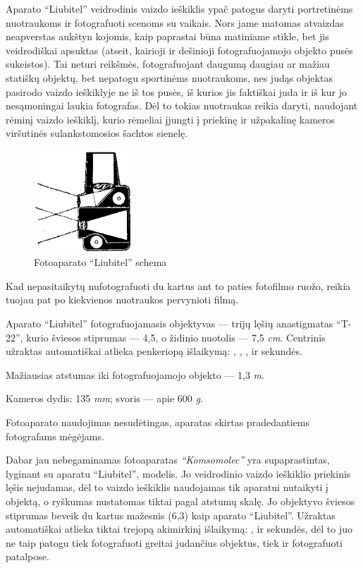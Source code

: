 \documentclass[12pt]{book}
\begin{document}
			Aparato ``Liubitel'' veidrodinis vaizdo ieškiklis ypač patogus daryti portretinėms nuotraukoms ir fotografuoti scenoms su vaikais. Nors jame matomas atvaizdas neapverstas aukštyn kojomis, kaip paprastai būna matiniame stikle, bet jis veidrodiškai apsuktas (atseit, kairioji ir dešinioji fotografuojamojo objekto pusės sukeistos). Tai neturi reikšmės, fotografuojant daugumą daugiau ar mažiau statiškų objektų, bet nepatogu sportinėms nuotraukoms, nes judąs objektas pasirodo vaizdo ieškiklyje ne iš tos pusės, iš kurios jis faktiškai juda ir iš kur jo nesąmoningai laukia fotografas. Dėl to tokias nuotraukas reikia daryti, naudojant rėminį vaizdo ieškiklį, kurio rėmeliai įjungti į priekinę ir užpakalinę kameros viršutinės sulankstomosios šachtos sienelę.
			\begin{figure}
				\centering
				\includegraphics[width=0.33\textwidth]{18-pav}
				\caption{Fotoaparato ``Liubitel'' schema}
				\label{fig:18}
			\end{figure}

			Kad nepasitaikytų nufotografuoti du kartus ant to paties fotofilmo ruožo, reikia tuojau pat po kiekvienos nuotraukos pervynioti filmą.

			Aparato ``Liubitel'' fotografuojamasis objektyvas --- trijų lęšių anastigmatas ``T-22'', kurio šviesos stiprumas --- 4,5, o židinio nuotolis --- 7,5 \textit{cm}. Centrinis užraktas automatiškai atlieka penkeriopą išlaikymą: , , ,  ir  sekundės.

			Mažiausias atstumas iki fotografuojamojo objekto --- 1,3 \textit{m}.

			Kameros dydis: 135 \texttimes 90  \textit{mm}; svoris --- apie 600 \textit{g}.

			Fotoaparato naudojimas nesudėtingas, aparatas skirtas pradedantiems fotografams mėgėjams.

			Dabar jau nebegaminamas fotoaparatas \textit{``Komsomolec''} yra supaprastintas, lyginant su aparatu ``Liubitel'', modelis. Jo veidrodinio vaizdo ieškiklio priekinis lęšis nejudamas, dėl to vaizdo ieškiklis naudojamas tik aparatui nutaikyti į objektą, o ryškumas nustatomas tiktai pagal atstumų skalę. Jo objektyvo šviesos stiprumas beveik du kartus mažesnis (6,3) kaip aparato ``Liubitel''. Užraktas automatiškai atlieka tiktai trejopą akimirkinį išlaikymą: ,  ir  sekundės, dėl to juo ne taip patogu tiek fotografuoti greitai judančius objektus, tiek ir fotografuoti patalpose.
\end{document}
